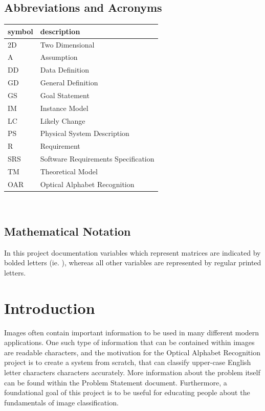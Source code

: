 \documentclass[12pt]{article}
\begin{document}
\subsection{Abbreviations and Acronyms}

\renewcommand{\arraystretch}{1.2}
\begin{tabular}{l l} 
  \toprule		
  \textbf{symbol} & \textbf{description}\\
  \midrule 
  2D & Two Dimensional\\
  A & Assumption\\
  DD & Data Definition\\
  GD & General Definition\\
  GS & Goal Statement\\
  IM & Instance Model\\
  LC & Likely Change\\
  PS & Physical System Description\\
  R & Requirement\\
  SRS & Software Requirements Specification\\
  TM & Theoretical Model\\
  OAR & Optical Alphabet Recognition\\
  \bottomrule
\end{tabular}\\

\subsection{Mathematical Notation}

In this project documentation variables which represent matrices are indicated by bolded letters (ie. ), whereas
all other variables are represented by regular printed letters.


\newpage


\section{Introduction}

Images often contain important information to be used in many different modern applications. One such type 
of information that can be contained within images are readable characters, and the motivation for the Optical Alphabet 
Recognition project is to create a system from scratch, that can classify upper-case English letter characters characters accurately.
More information about the problem itself can be found within the Problem Statement document. Furthermore, a foundational goal of
this project is to be useful for educating people about the fundamentals of image classification.
\end{document}
